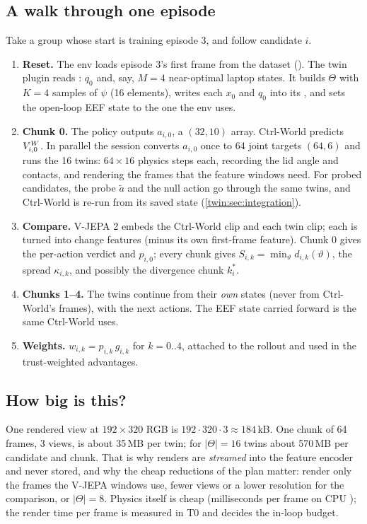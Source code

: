 \subsection{A walk through one episode}
Take a group whose start is training episode 3, and follow candidate $i$.
\begin{enumerate}
\item \textbf{Reset.} The env loads episode 3's first frame from the dataset (). The twin plugin reads : $q_0$ and, say, $M=4$ near-optimal laptop states. It builds $\Theta$ with $K=4$ samples of $\psi$ (16 elements), writes each $x_0$ and $q_0$ into its , and sets the open-loop EEF state to the one the env uses.
\item \textbf{Chunk 0.} The policy outputs $a_{i,0}$, a $(32,10)$ array. Ctrl-World predicts $V^{W}_{i,0}$. In parallel the session converts $a_{i,0}$ once to 64 joint targets $(64,6)$ and runs the 16 twins: $64\times16$ physics steps each, recording the lid angle and contacts, and rendering the frames that the feature windows need. For probed candidates, the probe $\tilde a$ and the null action go through the same twins, and Ctrl-World is re-run from its saved state (\cref{twin:sec:integration}).
\item \textbf{Compare.} V-JEPA 2 embeds the Ctrl-World clip and each twin clip; each is turned into change features (minus its own first-frame feature). Chunk 0 gives the per-action verdict and $p_{i,0}$; every chunk gives $S_{i,k}=\min_\vartheta d_{i,k}(\vartheta)$, the spread $\kappa_{i,k}$, and possibly the divergence chunk $k^\ast_i$.
\item \textbf{Chunks 1--4.} The twins continue from their \emph{own} states (never from Ctrl-World's frames), with the next actions. The EEF state carried forward is the same  Ctrl-World uses.
\item \textbf{Weights.} $w_{i,k}=p_{i,k}\,g_{i,k}$ for $k=0..4$, attached to the rollout and used in the trust-weighted advantages.
\end{enumerate}

\subsection{How big is this?}\label{twin:sec:size}
One rendered view at $192\times320$ RGB is $192\cdot320\cdot3\approx184$\,kB. One chunk of 64 frames, 3 views, is about 35\,MB per twin; for $|\Theta|=16$ twins about 570\,MB per candidate and chunk. That is why renders are \emph{streamed} into the feature encoder and never stored, and why the cheap reductions of the plan matter: render only the frames the V-JEPA windows use, fewer views or a lower resolution for the comparison, or $|\Theta|=8$. Physics itself is cheap (milliseconds per frame on CPU \chk); the render time per frame is measured in T0 and decides the in-loop budget.

